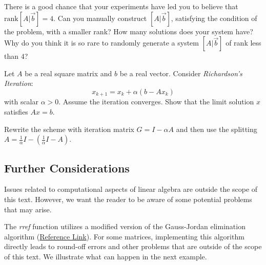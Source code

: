 \documentclass{ximera}
\begin{document}
\begin{problem}
    There is a good chance that your experiments have led you to believe that $\text{rank}[A | \vec{b}]=4$.  Can you manually construct $[A | \vec{b}]$, satisfying the condition of the problem, with a smaller rank?  How many solutions does your system have?  Why do you think it is so rare to randomly generate a system $[A | \vec{b}]$ of rank less than $4$?
     
\end{problem}

\begin{problem}\label{prob:Richardson}
Let $A$ be a real square matrix and $b$ be a real vector. Consider \emph{Richardson's Iteration}:
$$x_{k+1} = x_k + \alpha(b-Ax_k)$$
with scalar $\alpha>0.$ Assume the iteration converges. Show that the limit solution $x$ satisfies $Ax= b.$

\begin{hint}
    Rewrite the scheme with iteration matrix $G = I-\alpha A$ and then use the splitting $A = \frac{1}{\alpha} I - \left(\frac{1}{\alpha} I -A\right)$.
\end{hint}

\end{problem}

 
\subsection*{Further Considerations}
Issues related to computational aspects of linear algebra are outside the scope of this text.  However, we want the reader to be aware of some potential problems that may arise.
 
\begin{warning}
    The \emph{rref} function utilizes a modified version of the Gauss-Jordan elimination algorithm (\href{https://www.mathworks.com/help/matlab/ref/rref.html}{Reference Link}).  For some matrices, implementing this algorithm directly leads to round-off errors and other problems that are outside of the scope of this text.  %
    We illustrate what can happen in the next example.  
\end{warning}
 
\end{document}
